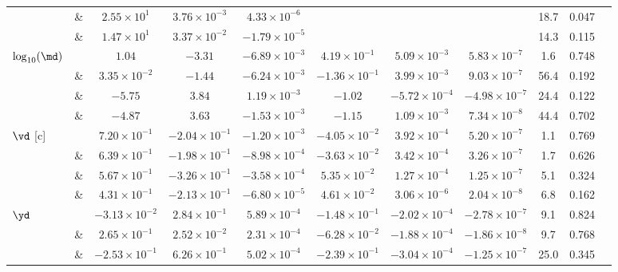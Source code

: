 \begin{table*}
\begin{tabular}{l|l|ccccccccc}
        & \& \DSheatcool{} & $2.55\times10^{1}$ & $3.76\times10^{-3}$ & $4.33\times10^{-6}$ & & & & 18.7 & 0.047 \\ 
        & \& \DScool{} & $1.47\times10^{1}$ & $3.37\times10^{-2}$ & $-1.79\times10^{-5}$ & & & & 14.3 & 0.115 \\ 
        \hline\hline
        $\log_{10}(\md)$ & \DSrefset{} & $1.04$ & $-3.31$ & $-6.89\times10^{-3}$ & $4.19\times10^{-1}$ & $5.09\times10^{-3}$ & $5.83\times10^{-7}$ & 1.6 & 0.748 \\ 
\rowcolor{lightgray} & \& \DSheatcool{} & $3.35\times10^{-2}$ & $-1.44$ & $-6.24\times10^{-3}$ & $-1.36\times10^{-1}$ & $3.99\times10^{-3}$ & $9.03\times10^{-7}$ & 56.4 & 0.192 \\ 
        & \& \DScool{} & $-5.75$ & $3.84$ & $1.19\times10^{-3}$ & $-1.02$ & $-5.72\times10^{-4}$ & $-4.98\times10^{-7}$ & 24.4 & 0.122 \\ 
        & \& \DSnone{} & $-4.87$ & $3.63$ & $-1.53\times10^{-3}$ & $-1.15$ & $1.09\times10^{-3}$ & $7.34\times10^{-8}$ & 44.4 & 0.702 \\
        \hline
        $\vd$ [c] & \DSrefset{} & $7.20\times10^{-1}$ & $-2.04\times10^{-1}$ & $-1.20\times10^{-3}$ & $-4.05\times10^{-2}$ & $3.92\times10^{-4}$ & $5.20\times10^{-7}$ & 1.1 & 0.769 \\ 
\rowcolor{lightgray} & \& \DSheatcool{} & $6.39\times10^{-1}$ & $-1.98\times10^{-1}$ & $-8.98\times10^{-4}$ & $-3.63\times10^{-2}$ & $3.42\times10^{-4}$ & $3.26\times10^{-7}$ & 1.7 & 0.626 \\ 
        & \& \DScool{} & $5.67\times10^{-1}$ & $-3.26\times10^{-1}$ & $-3.58\times10^{-4}$ & $5.35\times10^{-2}$ & $1.27\times10^{-4}$ & $1.25\times10^{-7}$ & 5.1 & 0.324 \\ 
        & \& \DSnone{} & $4.31\times10^{-1}$ & $-2.13\times10^{-1}$ & $-6.80\times10^{-5}$ & $4.61\times10^{-2}$ & $3.06\times10^{-6}$ & $2.04\times10^{-8}$ & 6.8 & 0.162 \\ 
        \hline
        $\yd$ & \DSrefset{} & $-3.13\times10^{-2}$ & $2.84\times10^{-1}$ & $5.89\times10^{-4}$ & $-1.48\times10^{-1}$ & $-2.02\times10^{-4}$ & $-2.78\times10^{-7}$ & 9.1 & 0.824 \\ 
\rowcolor{lightgray} & \& \DSheatcool{} & $2.65\times10^{-1}$ & $2.52\times10^{-2}$ & $2.31\times10^{-4}$ & $-6.28\times10^{-2}$ & $-1.88\times10^{-4}$ & $-1.86\times10^{-8}$ & 9.7 & 0.768 \\ 
        & \& \DScool{} & $-2.53\times10^{-1}$ & $6.26\times10^{-1}$ & $5.02\times10^{-4}$ & $-2.39\times10^{-1}$ & $-3.04\times10^{-4}$ & $-1.25\times10^{-7}$ & 25.0 & 0.345 \\

\end{tabular}
\end{table*}
